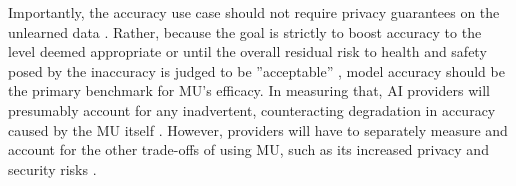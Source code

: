 Importantly, the accuracy use case should not require privacy guarantees on the unlearned data \citep{goel2023adversarialevaluationsinexactmachine}. Rather, because the goal is strictly to boost accuracy to the level deemed appropriate  \citep[Art. 15]{european_union_ai_act_2024} or until the overall residual risk to health and safety posed by the inaccuracy is judged to be ''acceptable'' \citep[Art. 9]{european_union_ai_act_2024}, model accuracy should be the primary benchmark for MU's efficacy. In measuring that, AI providers will presumably account for any inadvertent, counteracting degradation in accuracy caused by the MU itself \cite{LI2024100254, DBLP:conf/sp/BourtouleCCJTZL21, Xu_2024}. However, providers will have to separately measure and account for the other trade-offs of using MU, such as its increased privacy and security risks \citep{Xu_2024, carlini2022privacyonioneffectmemorization}.  




